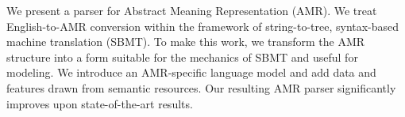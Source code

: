 We present a parser for Abstract Meaning Representation (AMR). We treat English-to-AMR conversion within the framework of string-to-tree, syntax-based machine translation (SBMT). To make this work, we transform the AMR structure into a form suitable for the mechanics of SBMT and useful for modeling. We introduce an AMR-specific language model and add data and features drawn from semantic resources. Our resulting AMR parser significantly improves upon state-of-the-art results.
